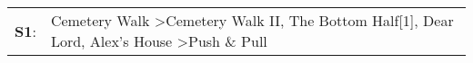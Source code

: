 \begin{supertabular}{p{0.03\textwidth}p{0.92\textwidth}}
 \textbf{S1}:  &  Cemetery Walk\textsuperscript{} \textgreater \enspace Cemetery Walk II\textsuperscript{}, \enspace The Bottom Half[1]\textsuperscript{}, \enspace Dear Lord\textsuperscript{}, \enspace Alex's House\textsuperscript{} \textgreater \enspace Push \& Pull\textsuperscript{}  \enspace  \\
\end{supertabular}
